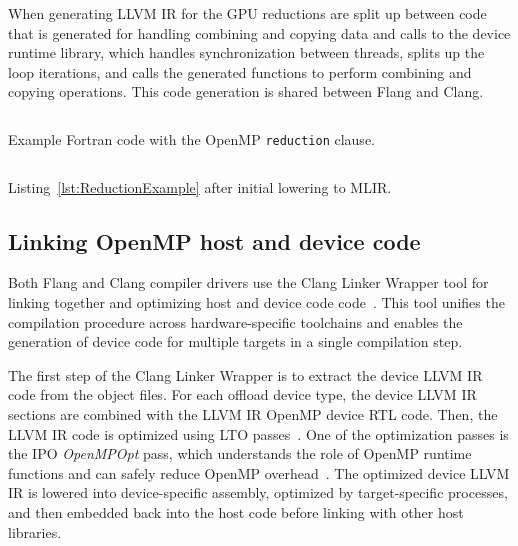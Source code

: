 \documentclass[acmtog,natbib=false]{acmart}
\newcommand{\code}[1]{\texttt{#1}\xspace}
\begin{document}
When generating LLVM \ac{IR} for the GPU reductions are split up between code that is generated for handling combining and copying data and calls to the device runtime library, which handles synchronization between threads, splits up the loop iterations, and calls the generated functions to perform combining and copying operations. This code generation is shared between Flang and Clang.

\begin{listing}[t]
\inputminted{Fortran}{code/tgt_reduction.f90}
\caption{Example Fortran code with the OpenMP \code{reduction} clause.}
\label{lst:ReductionExample}
\end{listing}

\begin{listing}[t]
\inputminted{MLIR-lexer.py:MlirLexer -x}{code/tgt_reduction_abridged.fir}
\caption{Listing~\ref{lst:ReductionExample} after initial lowering to \acs{MLIR}.}
\label{lst:MLIRReductionExample}
\end{listing}

\subsection{Linking OpenMP host and device code}
\label{sec:LinkingOpenMPHostandDeviceCode}
Both Flang and Clang compiler drivers use the Clang Linker Wrapper tool for linking together and optimizing host and device code code~\cite{LLVM25}.
This tool unifies the compilation procedure across hardware-specific toolchains and enables the generation of device code for multiple targets in a single compilation step.

The first step of the Clang Linker Wrapper is to extract the device LLVM IR code from the object files.
For each offload device type, the device LLVM \ac{IR} sections are combined with the LLVM \ac{IR} OpenMP device \ac{RTL} code.
Then, the LLVM \ac{IR} code is optimized using \ac{LTO} passes~\cite{clangLinkerWrapper}.
One of the optimization passes is the \ac{IPO} \textit{OpenMPOpt} pass, which understands the role of OpenMP runtime functions and can safely reduce OpenMP overhead~\cite{OpenMPOpt}.
The optimized device LLVM \ac{IR} is lowered into device-specific assembly, optimized by target-specific processes, and then embedded back into the host code before linking with other host libraries.

\end{document}
